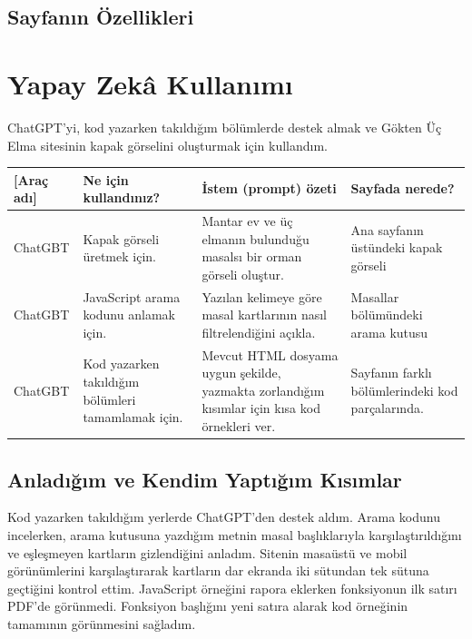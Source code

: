 \documentclass[12pt,a4paper]{article}
\begin{document}
\subsection{Sayfanın Özellikleri}


\section{Yapay Zekâ Kullanımı}
ChatGPT’yi, kod yazarken takıldığım bölümlerde destek almak ve Gökten Üç Elma sitesinin kapak görselini oluşturmak için kullandım.

\begin{longtable}{@{}p{2.6cm}p{3.6cm}p{4.2cm}p{3.4cm}@{}}
\toprule
\textbf [Araç adı]& \textbf{Ne için kullandınız?} & \textbf{İstem (prompt) özeti} & \textbf{Sayfada nerede?} \\
\midrule
\endhead
\relax ChatGBT & Kapak görseli üretmek için. & Mantar ev ve üç elmanın bulunduğu masalsı bir orman görseli oluştur. & Ana sayfanın üstündeki kapak görseli \\
\relax ChatGBT & JavaScript arama kodunu anlamak için. & Yazılan kelimeye göre masal kartlarının nasıl filtrelendiğini açıkla. & Masallar bölümündeki arama kutusu \\
\relax ChatGBT & Kod yazarken takıldığım bölümleri tamamlamak için. & Mevcut HTML dosyama uygun şekilde, yazmakta zorlandığım kısımlar için kısa kod örnekleri ver. & Sayfanın farklı bölümlerindeki kod parçalarında. \\
\bottomrule
\end{longtable}

\subsection{Anladığım ve Kendim Yaptığım Kısımlar}
Kod yazarken takıldığım yerlerde ChatGPT’den destek aldım. Arama kodunu incelerken, arama kutusuna yazdığım metnin masal başlıklarıyla karşılaştırıldığını ve eşleşmeyen kartların gizlendiğini anladım. Sitenin masaüstü ve mobil görünümlerini karşılaştırarak kartların dar ekranda iki sütundan tek sütuna geçtiğini kontrol ettim. JavaScript örneğini rapora eklerken fonksiyonun ilk satırı PDF’de görünmedi. Fonksiyon başlığını yeni satıra alarak kod örneğinin tamamının görünmesini sağladım.

\end{document}
